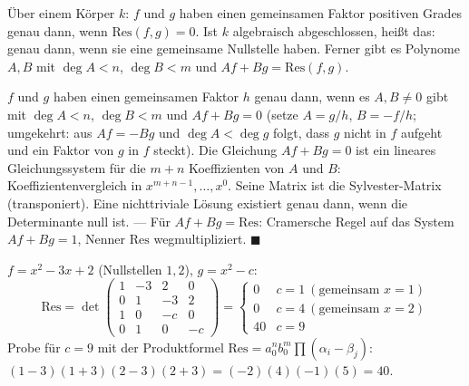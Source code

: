 \begin{merksatz}
Über einem Körper $k$: $f$ und $g$ haben einen gemeinsamen Faktor positiven Grades genau dann, wenn $\mathrm{Res}(f, g) = 0$. Ist $k$ algebraisch abgeschlossen, heißt das: genau dann, wenn sie eine gemeinsame Nullstelle haben. Ferner gibt es Polynome $A, B$ mit $\deg A < n$, $\deg B < m$ und $Af + Bg = \mathrm{Res}(f, g)$.

$f$ und $g$ haben einen gemeinsamen Faktor $h$ genau dann, wenn es $A, B\ne0$ gibt mit $\deg A < n$, $\deg B < m$ und $Af + Bg = 0$ (setze $A = g/h$, $B = -f/h$; umgekehrt: aus $Af = -Bg$ und $\deg A < \deg g$ folgt, dass $g$ nicht in $f$ aufgeht und ein Faktor von $g$ in $f$ steckt). Die Gleichung $Af + Bg = 0$ ist ein lineares Gleichungssystem für die $m + n$ Koeffizienten von $A$ und $B$: Koeffizientenvergleich in $x^{m+n-1}, \ldots, x^{0}$. Seine Matrix ist die Sylvester-Matrix (transponiert). Eine nichttriviale Lösung existiert genau dann, wenn die Determinante null ist. --- Für $Af + Bg = \mathrm{Res}$: Cramersche Regel auf das System $Af + Bg = 1$, Nenner $\mathrm{Res}$ wegmultipliziert. $\blacksquare$

$f = x^{2} - 3x + 2$ (Nullstellen $1, 2$), $g = x^{2} - c$:
\[ \mathrm{Res} = \det\begin{pmatrix}1 & -3 & 2 & 0\\ 0 & 1 & -3 & 2\\ 1 & 0 & -c & 0\\ 0 & 1 & 0 & -c\end{pmatrix} = \begin{cases}0 & c = 1\ (\text{gemeinsam } x = 1)\\ 0 & c = 4\ (\text{gemeinsam } x = 2)\\ 40 & c = 9\end{cases} \]
Probe für $c = 9$ mit der Produktformel $\mathrm{Res} = a_0^{n}b_0^{m}\prod(\alpha_i - \beta_j)$: $(1-3)(1+3)(2-3)(2+3) = (-2)(4)(-1)(5) = 40$. \checkmark

\begin{center}
\begin{minipage}{0.88\textwidth}
\end{minipage}
\end{center}
\end{merksatz}

